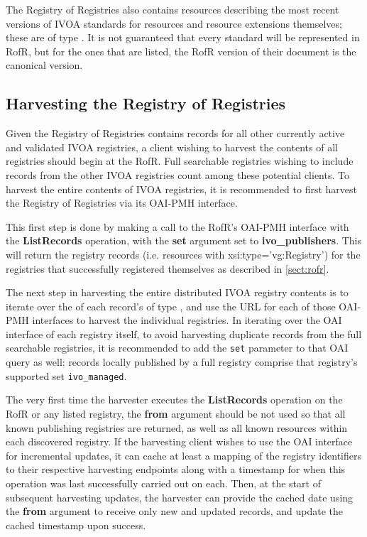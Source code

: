 \documentclass{ivoa}
\begin{document}
The Registry of Registries also contains resources describing
the most recent versions of IVOA standards for resources and
resource extensions themselves; these are of type . 
It is not guaranteed that every standard will be represented in RofR,
but for the ones that are listed, the RofR version of their document
is the canonical version.

\subsection{Harvesting the Registry of Registries}

\label{sect:harvestrofr}

Given the Registry of Registries contains records for all other
currently active and validated IVOA registries, a client wishing to
harvest the contents of all registries should begin at the RofR. Full 
searchable registries wishing to include records from the other IVOA
registries count among these potential clients. To harvest the entire
contents of IVOA registries, it is recommended to first harvest the
Registry of Registries via its OAI-PMH interface.

This first step is done by making a call to the RofR's OAI-PMH interface
with the \textbf{ListRecords} operation, with the \textbf{set} argument
set to \textbf{ivo\_publishers}. This will return the registry records
(i.e. resources with xsi:type='vg:Registry') for the registries that
successfully registered themselves as described in \ref{sect:rofr}. 

The next step in harvesting the entire distributed IVOA registry
contents is to iterate over the  of each
 record's  of type
, and use the URL for each of those OAI-PMH interfaces
to harvest the individual registries. In iterating over the OAI interface
of each registry itself, to avoid harvesting duplicate records from the 
full searchable registries, it is recommended to add the \texttt{set} 
parameter to that OAI query as well: records locally published by 
a full registry comprise that registry's supported set \texttt{ivo\_managed}.

The very first time the harvester executes the \textbf{ListRecords}
operation on the RofR or any listed registry, the \textbf{from} argument
should be not used so that all known publishing registries are returned,
as well as all known resources within each discovered registry. If the
harvesting client wishes to use the OAI interface for incremental
updates, it can cache at least a mapping of the registry identifiers to
their respective harvesting endpoints along with a timestamp for when
this operation was last successfully carried out on each. Then, at the
start of subsequent harvesting updates, the harvester can provide the
cached date using the \textbf{from} argument to receive only new and
updated records, and update the cached timestamp upon success.  
\end{document}
